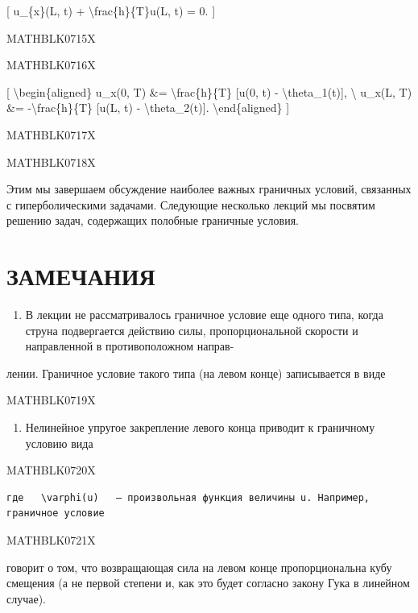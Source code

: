 \documentclass[
]{article}
\providecommand{\tightlist}{%
  \setlength{\itemsep}{0pt}\setlength{\parskip}{0pt}}
\begin{document}
{[} u\_\{x\}(L, t) + \textbackslash frac\{h\}\{T\}u(L, t) = 0. {]}

MATHBLK0715X

MATHBLK0716X

{[} \textbackslash begin\{aligned\} u\_x(0, T) \&=
\textbackslash frac\{h\}\{T\} {[}u(0, t) -
\textbackslash theta\_1(t){]}, \textbackslash{} u\_x(L, T) \&=
-\textbackslash frac\{h\}\{T\} {[}u(L, t) -
\textbackslash theta\_2(t){]}. \textbackslash end\{aligned\} {]}

MATHBLK0717X

MATHBLK0718X

Этим мы завершаем обсуждение наиболее важных граничных условий,
связанных с гиперболическими задачами. Следующие несколько лекций мы
посвятим решению задач, содержащих полобные граничные условия.

\section{ЗАМЕЧАНИЯ}\label{ux437ux430ux43cux435ux447ux430ux43dux438ux44f-4}

\begin{enumerate}
\def\labelenumi{\arabic{enumi}.}
\tightlist
\item
  В лекции не рассматривалось граничное условие еще одного типа, когда
  струна подвергается действию силы, пропорциональной скорости и
  направленной в противоположном направ-
\end{enumerate}

лении. Граничное условие такого типа (на левом конце) записывается в
виде

MATHBLK0719X

\begin{enumerate}
\def\labelenumi{\arabic{enumi}.}
\setcounter{enumi}{1}
\tightlist
\item
  Нелинейное упругое закрепление левого конца приводит к граничному
  условию вида
\end{enumerate}

MATHBLK0720X

\begin{verbatim}
где   \varphi(u)   — произвольная функция величины u. Например, граничное условие
\end{verbatim}

MATHBLK0721X

говорит о том, что возвращающая сила на левом конце пропорциональна кубу
смещения (а не первой степени и, как это будет согласно закону Гука в
линейном случае).
\end{document}
